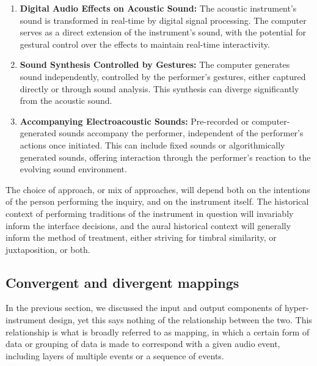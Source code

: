 \documentclass[12pt,twoside,maitrise]{dms_ks}
\theoremstyle{definition}
\begin{document}
{\begin{enumerate}
  \item \textbf{Digital Audio Effects on Acoustic Sound:} The acoustic instrument's sound is transformed in real-time by digital signal processing. 
The computer serves as a direct extension of the instrument's sound, with the potential for gestural control over the effects to maintain real-time interactivity.
  
  \item \textbf{Sound Synthesis Controlled by Gestures:} The computer generates sound independently, controlled by the performer's gestures, either captured directly or through sound analysis. 
This synthesis can diverge significantly from the acoustic sound.
  
  \item \textbf{Accompanying Electroacoustic Sounds:} Pre-recorded or computer-generated sounds accompany the performer, independent of the performer's actions once initiated. 
This can include fixed sounds or algorithmically generated sounds, offering interaction through the performer's reaction to the evolving sound environment.
\end{enumerate}



The choice of approach, or mix of approaches, will depend both on the intentions of the person performing the inquiry, and on the instrument itself. The historical context of performing traditions of the instrument in question will invariably inform the interface decisions, and the aural historical context will generally inform the method of treatment, either striving for timbral similarity, or juxtaposition, or both.

\subsection{Convergent and divergent mappings}

In the previous section, we discussed the input and output components of hyper-instrument design, yet this says nothing of the relationship between the two.
This relationship is what is broadly referred to as mapping, in which a certain form of data or grouping of data is made to correspond with a given audio event, including layers of multiple events or a sequence of events. 

}
\end{document}
